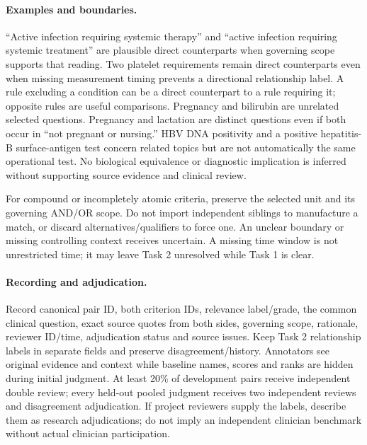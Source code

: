 \documentclass[10pt,letterpaper]{article}
\begin{document}
\paragraph{Examples and boundaries.}
``Active infection requiring systemic therapy'' and ``active infection requiring
systemic treatment'' are plausible direct counterparts when governing scope
supports that reading. Two platelet requirements remain direct counterparts
even when missing measurement timing prevents a directional relationship label.
A rule excluding a condition can be a direct counterpart to a rule requiring it;
opposite rules are useful comparisons. Pregnancy and bilirubin are unrelated
selected questions. Pregnancy and lactation are distinct questions even if
both occur in ``not pregnant or nursing.'' HBV DNA positivity and a positive
hepatitis-B surface-antigen test concern related topics but are not automatically
the same operational test. No biological equivalence or diagnostic implication
is inferred without supporting source evidence and clinical review.

For compound or incompletely atomic criteria, preserve the selected unit and
its governing AND/OR scope. Do not import independent siblings to manufacture
a match, or discard alternatives/qualifiers to force one. An unclear boundary
or missing controlling context receives uncertain. A missing time window is
not unrestricted time; it may leave Task 2 unresolved while Task 1 is clear.

\paragraph{Recording and adjudication.}
Record canonical pair ID, both criterion IDs, relevance label/grade, the common
clinical question, exact source quotes from both sides, governing scope,
rationale, reviewer ID/time, adjudication status and source issues. Keep Task 2
relationship labels in separate fields and preserve disagreement/history.
Annotators see original evidence and context while baseline names, scores and
ranks are hidden during initial judgment. At least 20\% of development pairs
receive independent double review; every held-out pooled judgment receives
two independent reviews and disagreement adjudication. If project reviewers
supply the labels, describe them as research adjudications; do not imply an
independent clinician benchmark without actual clinician participation.
\end{document}
